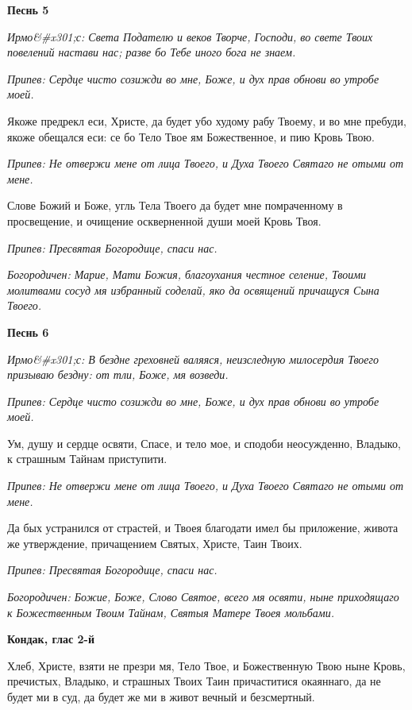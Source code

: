 \bfseries Песнь 5\normalfont{}


\itshape Ирмо&#x301;с:\normalfont{} Света Подателю и веков Творче, Господи, во свете Твоих повелений настави нас; разве бо Тебе иного бога не знаем.


\itshape Припев: \normalfont{}Сердце чисто созижди во мне, Боже, и дух прав обнови во утробе моей.


Якоже предрекл еси, Христе, да будет убо худому рабу Твоему, и во мне пребуди, якоже обещался еси: се бо Тело Твое ям Божественное, и пию Кровь Твою.


\itshape Припев: \normalfont{}Не отвержи мене от лица Твоего, и Духа Твоего Святаго не отыми от мене.


Слове Божий и Боже, угль Тела Твоего да будет мне помраченному в просвещение, и очищение оскверненной души моей Кровь Твоя.


\itshape Припев: \normalfont{}Пресвятая Богородице, спаси нас.


\itshape Богородичен: \normalfont{}Марие, Мати Божия, благоухания честное селение, Твоими молитвами сосуд мя избранный соделай, яко да освящений причащуся Сына Твоего.




\bfseries Песнь 6\normalfont{}


\itshape Ирмо&#x301;с:\normalfont{} В бездне греховней валяяся, неизследную милосердия Твоего призываю бездну: от тли, Боже, мя возведи.


\itshape Припев: \normalfont{}Сердце чисто созижди во мне, Боже, и дух прав обнови во утробе моей.


Ум, душу и сердце освяти, Спасе, и тело мое, и сподоби неосужденно, Владыко, к страшным Тайнам приступити.


\itshape Припев: \normalfont{}Не отвержи мене от лица Твоего, и Духа Твоего Святаго не отыми от мене.


Да бых устранился от страстей, и Твоея благодати имел бы приложение, живота же утверждение, причащением Святых, Христе, Таин Твоих.


\itshape Припев: \normalfont{}Пресвятая Богородице, спаси нас.


\itshape Богородичен: \normalfont{}Божие, Боже, Слово Святое, всего мя освяти, ныне приходящаго к Божественным Твоим Тайнам, Святыя Матере Твоея мольбами.




\bfseries Кондак, глас 2-й\normalfont{}


Хлеб, Христе, взяти не презри мя, Тело Твое, и Божественную Твою ныне Кровь, пречистых, Владыко, и страшных Твоих Таин причаститися окаяннаго, да не будет ми в суд, да будет же ми в живот вечный и безсмертный.




